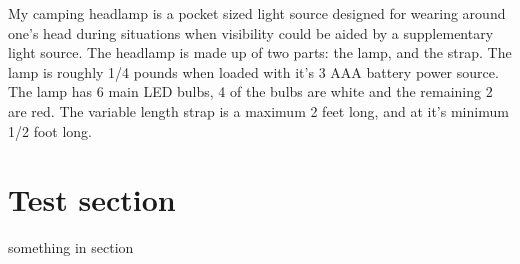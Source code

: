 \documentclass[12pt]{article}
\begin{document}
My camping headlamp is a pocket sized light source designed for wearing around one's head during
situations when visibility could be aided by a supplementary light source. The headlamp is made up
of two parts: the lamp, and the strap.  The lamp is roughly 1/4 pounds when loaded with it's 3 AAA
battery power source. The lamp has 6 main LED bulbs, 4 of the bulbs are white and the
remaining 2 are red. The variable length strap is a maximum 2 feet long, and at it's minimum 1/2 foot long.

\section{Test section}
something in section
\end{document}
